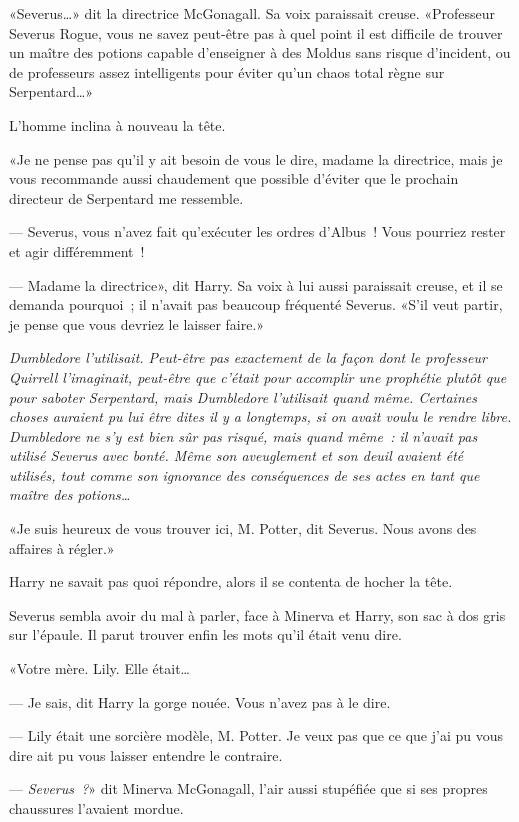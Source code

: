 «Severus…» dit la directrice McGonagall. Sa voix paraissait creuse. «Professeur Severus Rogue, vous ne savez peut-être pas à quel point il est difficile de trouver un maître des potions capable d'enseigner à des Moldus sans risque d'incident, ou de professeurs assez intelligents pour éviter qu'un chaos total règne sur Serpentard…»

L'homme inclina à nouveau la tête.

«Je ne pense pas qu'il y ait besoin de vous le dire, madame la directrice, mais je vous recommande aussi chaudement que possible d'éviter que le prochain directeur de Serpentard me ressemble.

--- Severus, vous n'avez fait qu'exécuter les ordres d'Albus~! Vous pourriez rester et agir différemment~!

--- Madame la directrice», dit Harry. Sa voix à lui aussi paraissait creuse, et il se demanda pourquoi~; il n'avait pas beaucoup fréquenté Severus. «S'il veut partir, je pense que vous devriez le laisser faire.»

\emph{Dumbledore l'utilisait. Peut-être pas exactement de la façon dont le professeur Quirrell l'imaginait, peut-être que c'était pour accomplir une prophétie plutôt que pour saboter Serpentard, mais Dumbledore l'utilisait quand même. Certaines choses auraient pu lui être dites il y a longtemps, si on avait voulu le rendre libre. Dumbledore ne s'y est bien sûr pas risqué, mais quand même~: il n'avait pas utilisé Severus avec bonté. Même son aveuglement et son deuil avaient été utilisés, tout comme son ignorance des conséquences de ses actes en tant que maître des potions…}

«Je suis heureux de vous trouver ici, M. Potter, dit Severus. Nous avons des affaires à régler.»

Harry ne savait pas quoi répondre, alors il se contenta de hocher la tête.

Severus sembla avoir du mal à parler, face à Minerva et Harry, son sac à dos gris sur l'épaule. Il parut trouver enfin les mots qu'il était venu dire.

«Votre mère. Lily. Elle était…

--- Je sais, dit Harry la gorge nouée. Vous n'avez pas à le dire.

--- Lily était une sorcière modèle, M. Potter. Je veux pas que ce que j'ai pu vous dire ait pu vous laisser entendre le contraire.

--- \emph{Severus~?}» dit Minerva McGonagall, l'air aussi stupéfiée que si ses propres chaussures l'avaient mordue.

